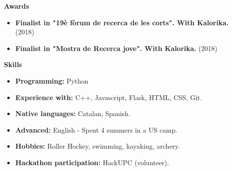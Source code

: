 \documentclass[letterpaper,12pt]{article}
\newcommand{\resitem}[1]{\item #1 \vspace{-2pt}}
\newcommand{\resheading}[1]{{\large \colorbox{mygrey}{\begin{minipage}{\textwidth}{\textbf{#1 \vphantom{p\^{E}}}}\end{minipage}}}}
\begin{document}
\resheading{Awards}
	\begin{itemize}
		\resitem{\textbf{Finalist in "19è fòrum de recerca de les corts". With Kalorika.} (2018)}
		\resitem{\textbf{Finalist in "Mostra de Recerca jove". With Kalorika.} (2018)}
	\end{itemize}



\resheading{Skills}
	\begin{itemize}
		\resitem{\textbf{Programming:} Python }
		\resitem{\textbf{Experience with:} C++, Javascript, Flask, HTML, CSS, Git.}
		\resitem{\textbf{Native languages:} Catalan, Spanish.}
		\resitem{ \textbf{Advanced:} English - Spent 4 summers in a US camp.}
		\resitem{\textbf{Hobbies:} Roller Hockey, swimming, kayaking, archery.}
		\resitem{\textbf{Hackathon participation:} HackUPC (volunteer).}
	\end{itemize}
\end{document}
